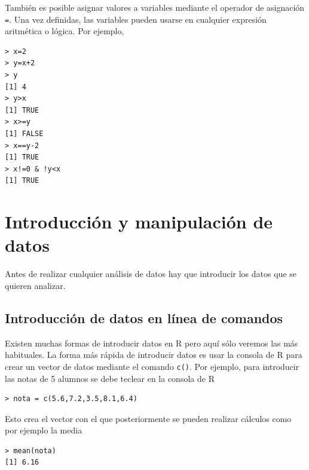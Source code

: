 También es posible asignar valores a variables mediante el operador de asignación \lstinline{=}. Una vez definidas, las
variables pueden usarse en cualquier expresión aritmética o lógica. Por ejemplo,
\begin{lstlisting}
> x=2
> y=x+2
> y
[1] 4
> y>x
[1] TRUE
> x>=y
[1] FALSE
> x==y-2
[1] TRUE
> x!=0 & !y<x
[1] TRUE
\end{lstlisting}


\section{Introducción y manipulación de datos}
Antes de realizar cualquier análisis de datos hay que introducir los datos que se quieren analizar. 


\subsection{Introducción de datos en línea de comandos}
Existen muchas formas de introducir datos en R pero aquí sólo veremos las más habituales. La forma más rápida de
introducir datos es usar la consola de R para crear un vector de datos mediante el comando \lstinline{c()}. Por ejemplo, para introducir las notas de 5
alumnos se debe teclear en la consola de R
\begin{lstlisting}
> nota = c(5.6,7.2,3.5,8.1,6.4)
\end{lstlisting}
Esto crea el vector  con el que posteriormente se pueden realizar cálculos como por ejemplo la
media
\begin{lstlisting}
> mean(nota)
[1] 6.16
\end{lstlisting}

